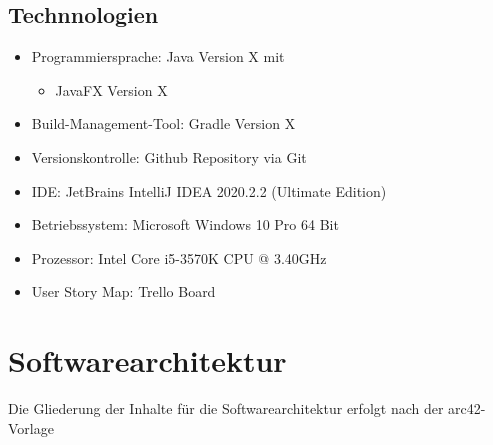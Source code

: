 \documentclass[11pt]{article}
\begin{document}
    \subsection{Technnologien}
    \begin{itemize}
        \item Programmiersprache: Java Version X mit
        \begin{itemize}
            \item JavaFX Version X
        \end{itemize}
        \item Build-Management-Tool: Gradle\cite{gradle} Version X
        \item Versionskontrolle: Github Repository\cite{github} via Git\cite{git}
        \item IDE: JetBrains IntelliJ IDEA\cite{idea} 2020.2.2 (Ultimate Edition)
        \item Betriebssystem: Microsoft Windows 10 Pro 64 Bit
        \item Prozessor: Intel Core i5-3570K CPU @ 3.40GHz
        \item User Story Map: Trello Board\cite{trello}
    \end{itemize}

    \newpage

    \section{Softwarearchitektur}
    Die Gliederung der Inhalte für die Softwarearchitektur erfolgt nach der arc42-Vorlage~\cite{arc42}
\end{document}
